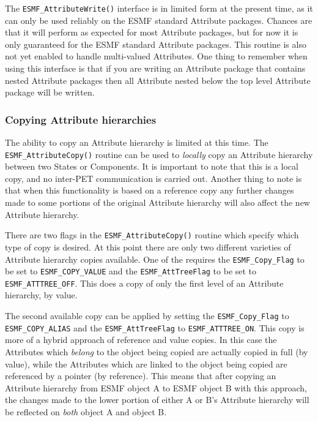 The {\tt ESMF\_AttributeWrite()} interface is in limited form at the present time, as it can only be used reliably on the ESMF standard Attribute packages.  Chances are that it will perform as expected for most Attribute packages, but for now it is only guaranteed for the ESMF standard Attribute packages.  This routine is also not yet enabled to handle multi-valued Attributes.    One thing to remember when using this interface is that if you are writing an Attribute package that contains nested Attribute packages then all Attribute nested below the top level Attribute package will be written.

\subsubsection{Copying Attribute hierarchies}
\label{sec:Att:Copy}

The ability to copy an Attribute hierarchy is limited at this time.  The {\tt ESMF\_AttributeCopy()} routine can be used to {\it locally} copy an Attribute hierarchy between two States or Components.  It is important to note that this is a local copy, and no inter-PET communication is carried out.  Another thing to note is that when this functionality is based on a reference copy any further changes made to some portions of the original Attribute hierarchy will also affect the new Attribute hierarchy.

\begin{sloppypar}
There are two flags in the {\tt ESMF\_AttributeCopy()} routine which specify which type of copy is desired.  At this point there are only two different varieties of Attribute hierarchy copies available.  One of the requires the {\tt ESMF\_Copy\_Flag} to be set to {\tt ESMF\_COPY\_VALUE} and the {\tt ESMF\_AttTreeFlag} to be set to {\tt ESMF\_ATTTREE\_OFF}.  This does a copy of only the first level of an Attribute hierarchy, by value.
\end{sloppypar}

The second available copy can be applied by setting the {\tt ESMF\_Copy\_Flag} to {\tt ESMF\_COPY\_ALIAS} and the {\tt ESMF\_AttTreeFlag} to {\tt ESMF\_ATTTREE\_ON}.  This copy is more of a hybrid approach of reference and value copies.  In this case the Attributes which {\it belong} to the object being copied are actually copied in full (by value), while the Attributes which are linked to the object being copied are referenced by a pointer (by reference).  This means that after copying an Attribute hierarchy from ESMF object A to ESMF object B with this approach, the changes made to the lower portion of either A or B's Attribute hierarchy will be reflected on {\it both} object A and object B.

